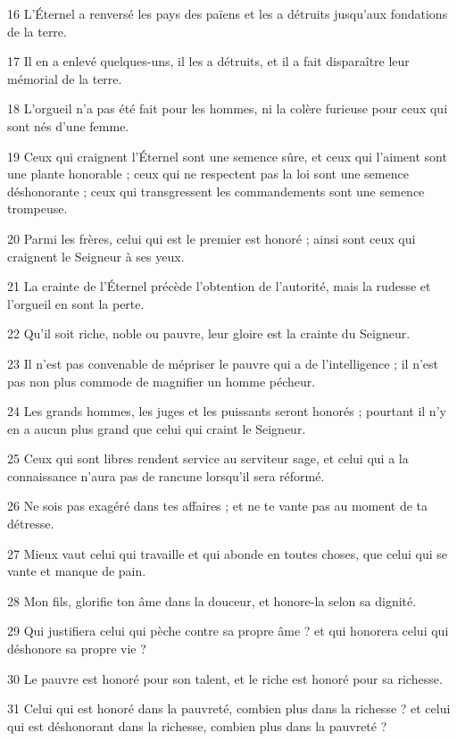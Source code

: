 \par 16 L'Éternel a renversé les pays des païens et les a détruits jusqu'aux fondations de la terre.
\par 17 Il en a enlevé quelques-uns, il les a détruits, et il a fait disparaître leur mémorial de la terre.
\par 18 L'orgueil n'a pas été fait pour les hommes, ni la colère furieuse pour ceux qui sont nés d'une femme.
\par 19 Ceux qui craignent l'Éternel sont une semence sûre, et ceux qui l'aiment sont une plante honorable ; ceux qui ne respectent pas la loi sont une semence déshonorante ; ceux qui transgressent les commandements sont une semence trompeuse.
\par 20 Parmi les frères, celui qui est le premier est honoré ; ainsi sont ceux qui craignent le Seigneur à ses yeux.
\par 21 La crainte de l'Éternel précède l'obtention de l'autorité, mais la rudesse et l'orgueil en sont la perte.
\par 22 Qu'il soit riche, noble ou pauvre, leur gloire est la crainte du Seigneur.
\par 23 Il n'est pas convenable de mépriser le pauvre qui a de l'intelligence ; il n’est pas non plus commode de magnifier un homme pécheur.
\par 24 Les grands hommes, les juges et les puissants seront honorés ; pourtant il n’y en a aucun plus grand que celui qui craint le Seigneur.
\par 25 Ceux qui sont libres rendent service au serviteur sage, et celui qui a la connaissance n'aura pas de rancune lorsqu'il sera réformé.
\par 26 Ne sois pas exagéré dans tes affaires ; et ne te vante pas au moment de ta détresse.
\par 27 Mieux vaut celui qui travaille et qui abonde en toutes choses, que celui qui se vante et manque de pain.
\par 28 Mon fils, glorifie ton âme dans la douceur, et honore-la selon sa dignité.
\par 29 Qui justifiera celui qui pèche contre sa propre âme ? et qui honorera celui qui déshonore sa propre vie ?
\par 30 Le pauvre est honoré pour son talent, et le riche est honoré pour sa richesse.
\par 31 Celui qui est honoré dans la pauvreté, combien plus dans la richesse ? et celui qui est déshonorant dans la richesse, combien plus dans la pauvreté ?

